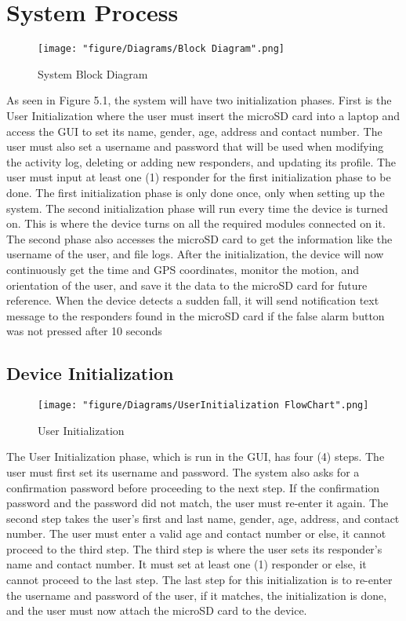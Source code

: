 \section{System Process}
\label{sec:process}

\begin{figure}[htbp]
	\centering
		\texttt{[image: "figure/Diagrams/Block Diagram".png]}
	\caption{System Block Diagram}
	\label{fig:Block Diagram}
\end{figure}

As seen in Figure 5.1, the system will have two initialization phases. First is the User Initialization where the user must insert the microSD card into a laptop and access the GUI to set its name, gender, age, address and contact number. The user must also set a username and password that will be used when modifying the activity log, deleting or adding new responders, and updating its profile. The user must input at least one (1) responder for the first initialization phase to be done. The first initialization phase is only done once, only when setting up the system. The second initialization phase will run every time the device is turned on. This is where the device turns on all the required modules connected on it. The second phase also accesses the microSD card to get the information like the username of the user, and file logs. After the initialization, the device will now continuously get the time and GPS coordinates, monitor the motion, and orientation of the user, and save it the data to the microSD card for future reference. When the device detects a sudden fall, it will send notification text message to the responders found in the microSD card if the false alarm button was not pressed after 10 seconds \cite{Kaz14}%

\subsection{Device Initialization}

\begin{figure}[htbp]
	\centering
		\texttt{[image: "figure/Diagrams/UserInitialization FlowChart".png]}
	\caption{User Initialization}
	\label{fig:UserInitialization FlowChart}
\end{figure}

The User Initialization phase, which is run in the GUI, has four (4) steps. The user must first set its username and password. The system also asks for a confirmation password before proceeding to the next step. If the confirmation password and the password did not match, the user must re-enter it again. The second step takes the user’s first and last name, gender, age, address, and contact number. The user must enter a valid age and contact number or else, it cannot proceed to the third step. The third step is where the user sets its responder’s name and contact number. It must set at least one (1) responder or else, it cannot proceed to the last step. The last step for this initialization is to re-enter the username and password of the user, if it matches, the initialization is done, and the user must now attach the microSD card to the device.

